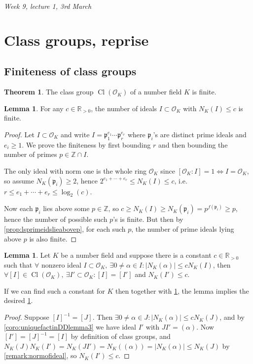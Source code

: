 \documentclass{article}
\newcommand{\Z}{\mathbb{Z}}
\newcommand{\R}{\mathbb{R}}
\newcommand{\Cl}{\operatorname{Cl}}
\newcommand{\ri}{\mathcal{O}}
\newcommand{\ip}{\mathfrak{p}}
\theoremstyle{definition}
\newtheorem{thm}[defn]{Theorem}
\newtheorem{lemma}[defn]{Lemma}
\begin{document}
\begin{flushright}
\textit{Week 9, lecture 1, 3rd March}
\end{flushright}

\section{Class groups, reprise}
\subsection{Finiteness of class groups}
\begin{thm}
\label{thm:clgrpisfin}
The class group $\Cl(\ri_K)$ of a number field $K$ is finite.
\end{thm}

\begin{lemma}
\label{lemma:nofidswnmleqcisfin}
For any $c\in\R_{>0}$, the number of ideals $I\subset\ri_K$ with $N_K(I)\leq c$ is finite.
\end{lemma}
\begin{proof}
Let $I\subset\ri_K$ and write $I=\ip_1^{e_1}\cdots\ip_r^{e_r}$ where $\ip_i$'s are distinct prime ideals and $e_i\geq 1$. We prove the finiteness by first bounding $r$ and then bounding the number of primes $p\in\Z\cap I$.

The only ideal with norm one is the whole ring $\ri_K$ since $[\ri_K:I]=1\iff I=\ri_K$, so assume $N_K(\ip_i)\geq 2$, hence $2^{e_1+\cdots+e_r}\leq N_K(I)\leq c$, i.e. $r\leq e_1+\cdots+e_r\leq\log_2(c)$.

Now each $\ip_i$ lies above some $p\in\Z$, so $c\geq N_K(I)\geq N_K(\ip_i)=p^{f(\ip_i)}\geq p$, hence the number of possible such $p$'s is finite. But then by \ref{prop:lsprimeidslieabovep}, for each such $p$, the number of prime ideals lying above $p$ is also finite.
\end{proof}

\begin{lemma}
\label{lemma:clgrpisgenby}
Let $K$ be a number field and suppose there is a constant $c\in\R_{>0}$ such that $\forall$ nonzero ideal $I\subset\ri_K,\ \exists 0\neq\alpha\in I:|N_K(\alpha)|\leq cN_K(I)$, then $\forall [I]\in\Cl(\ri_K),\ \exists I'\subset\ri_K:[I]=[I']$ and $N_K(I')\leq c$.
\end{lemma}
If we can find such a constant for $K$ then together with \ref{lemma:nofidswnmleqcisfin}, the lemma implies the desired \ref{thm:clgrpisfin}.
\begin{proof}
Suppose $[I]^{-1}=[J]$. Then $\exists 0\neq\alpha\in J:|N_K(\alpha)|\leq cN_K(J)$, and by \ref{coro:uniquefactinDDlemma3} we have ideal $I'$ with $JI'=(\alpha)$. Now $[I']=[J]^{-1}=[I]$ by definition of class groups, and $N_K(J)N_K(I')=N_K(JI')=N_K((\alpha))=|N_K(\alpha)|\leq N_K(J)$ by \ref{remark:normofideal}, so $N_K(I')\leq c$.
\end{proof}
\end{document}
